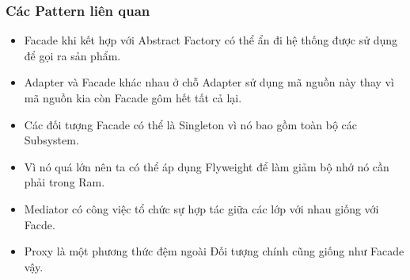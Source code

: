 \subsubsection{Các Pattern liên quan}
\begin{itemize}
    \item Facade khi kết hợp với Abstract Factory có thể ẩn đi hệ thống được sử dụng để gọi ra sản phẩm.
    \item Adapter và Facade khác nhau ở chỗ Adapter sử dụng mã nguồn này thay vì mã nguồn kia còn Facade gôm hết tất cả lại.
    \item Các đối tượng Facade có thể là Singleton vì nó bao gồm toàn bộ các Subsystem.
    \item Vì nó quá lớn nên ta có thể áp dụng Flyweight để làm giảm bộ nhớ nó cần phải trong Ram.
    \item Mediator có công việc tổ chức sự hợp tác giữa các lớp với nhau giống với Facde.
    \item Proxy là một phương thức đệm ngoài Đối tượng chính cũng giống như Facade vậy.
\end{itemize}

